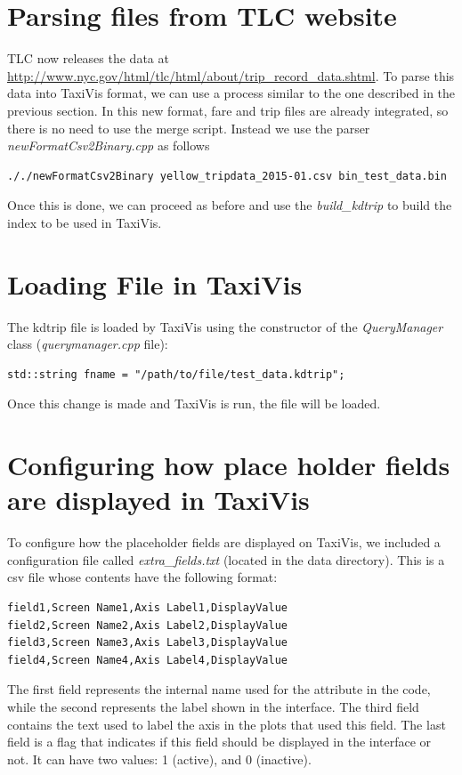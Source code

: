 \documentclass[12pt]{article}
\begin{document}
\section{Parsing files from TLC website}
TLC now releases the data at \url{http://www.nyc.gov/html/tlc/html/about/trip_record_data.shtml}. To parse this data into TaxiVis format, we can use a process similar to the one described in the previous section. In this new format, fare and trip files are already integrated, so there is no need to use the merge script. Instead we use the parser \emph{newFormatCsv2Binary.cpp} as follows

\lstset{language=bash}
\begin{lstlisting}
././newFormatCsv2Binary yellow_tripdata_2015-01.csv bin_test_data.bin
\end{lstlisting}

Once this is done, we can proceed as before and use the \emph{build\_kdtrip} to build the index to be used in TaxiVis.

\section{Loading File in TaxiVis}
The kdtrip file is loaded by TaxiVis using the constructor of the \emph{QueryManager} class (\emph{querymanager.cpp} file):

\lstset{language=C++}
\begin{lstlisting}
std::string fname = "/path/to/file/test_data.kdtrip";
\end{lstlisting}

Once this change is made and TaxiVis is run, the file will be  loaded.

\section{Configuring how place holder fields are displayed in TaxiVis}
To configure how the placeholder fields are displayed on TaxiVis, we included
a configuration file called \emph{extra\_fields.txt} (located in the data directory).
This is a csv file whose contents have the following format:
\begin{lstlisting}
field1,Screen Name1,Axis Label1,DisplayValue
field2,Screen Name2,Axis Label2,DisplayValue
field3,Screen Name3,Axis Label3,DisplayValue
field4,Screen Name4,Axis Label4,DisplayValue
\end{lstlisting}

The first field represents the internal name used for the attribute in
the code, while the second represents the label shown in the
interface.  The third field contains the text used to label the axis
in the plots that used this field. The last field is a flag
that indicates if this field should be displayed in the interface or
not. It can have two values: 1 (active), and 0 (inactive). 
\end{document}
